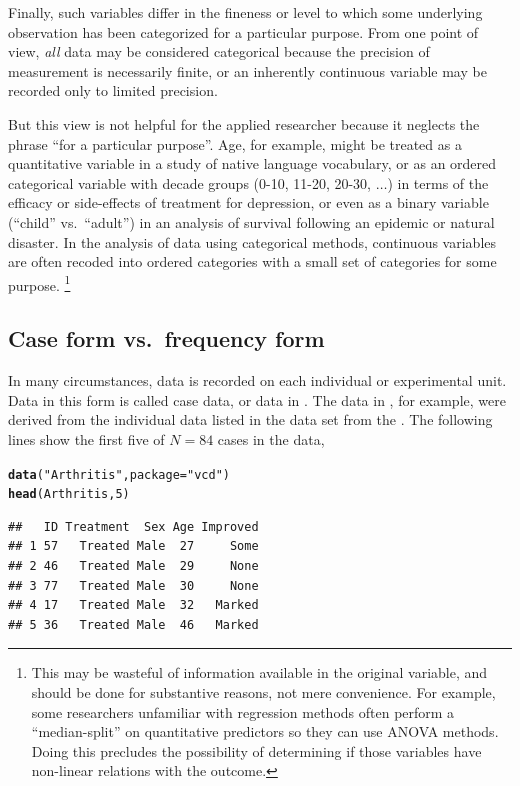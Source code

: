 \documentclass[11pt]{book}\usepackage[]{graphicx}\usepackage[]{color}
\makeatletter
\newcommand{\hlnum}[1]{\textcolor[rgb]{0.686,0.059,0.569}{#1}}%
\newcommand{\hlstr}[1]{\textcolor[rgb]{0.192,0.494,0.8}{#1}}%
\newcommand{\hlstd}[1]{\textcolor[rgb]{0.345,0.345,0.345}{#1}}%
\newcommand{\hlkwc}[1]{\textcolor[rgb]{0.333,0.667,0.333}{#1}}%
\newcommand{\hlkwd}[1]{\textcolor[rgb]{0.737,0.353,0.396}{\textbf{#1}}}%
\newenvironment{kframe}{%
 \def\at@end@of@kframe{}%
 \ifinner\ifhmode%
  \def\at@end@of@kframe{\end{minipage}}%
  \begin{minipage}{\columnwidth}%
 \fi\fi%
 \def\FrameCommand##1{\hskip\@totalleftmargin \hskip-\fboxsep
 \colorbox{shadecolor}{##1}\hskip-\fboxsep
     \hskip-\linewidth \hskip-\@totalleftmargin \hskip\columnwidth}%
 \MakeFramed {\advance\hsize-\width
   \@totalleftmargin\z@ \linewidth\hsize
   \@setminipage}}%
 {\par\unskip\endMakeFramed%
 \at@end@of@kframe}
\newenvironment{knitrout}{}{} %
\renewenvironment{knitrout}{\small\renewcommand{\baselinestretch}{.85}}{} %
\makeatother
\begin{document}
Finally, such variables differ in the
fineness or level to which some underlying observation has been
categorized for a particular purpose.
From one point of view, \emph{all} data
may be considered categorical because the precision of measurement
is necessarily finite, or an inherently continuous variable may be recorded only to limited precision.   

But this view is not helpful for the applied
researcher because it neglects the phrase ``for a particular purpose''.
Age, for example, might be treated as a quantitative variable in a study of native language vocabulary, or as an ordered categorical variable 
with decade groups (0-10, 11-20, 20-30, $\dots$)
in terms of
the efficacy or side-effects of treatment for depression, or even as a
binary variable (``child'' vs.\  ``adult'') in an analysis of survival following an epidemic or natural disaster. In the analysis of
data using categorical methods, continuous variables are often recoded
into ordered categories with a small set of categories for some purpose.%
\footnote{
This may be wasteful of information available in the original
variable, and should be done for substantive reasons, not mere
convenience.  For example, some researchers unfamiliar with
regression methods often perform a ``median-split'' on 
quantitative predictors
so they can use ANOVA methods. Doing this precludes the possibility
of determining if those variables have non-linear relations with
the outcome.
}

\subsection{Case form vs.\ frequency form}\label{sec:case-freq}
In many circumstances, data is recorded on each individual or experimental
unit.  Data in this form is called case data,
or data in .
The data in , for example, were derived from
the individual data listed in the data set 
from the .  The following lines show the first
five  of $N=84$ cases in the  data,
\begin{knitrout}
\color{fgcolor}\begin{kframe}
\begin{alltt}
\hlkwd{data}\hlstd{(}\hlstr{"Arthritis"}\hlstd{,} \hlkwc{package}\hlstd{=}\hlstr{"vcd"}\hlstd{)}
\hlkwd{head}\hlstd{(Arthritis,} \hlnum{5}\hlstd{)}
\end{alltt}
\begin{verbatim}
##   ID Treatment  Sex Age Improved
## 1 57   Treated Male  27     Some
## 2 46   Treated Male  29     None
## 3 77   Treated Male  30     None
## 4 17   Treated Male  32   Marked
## 5 36   Treated Male  46   Marked
\end{verbatim}
\end{kframe}
\end{knitrout}
\end{document}
